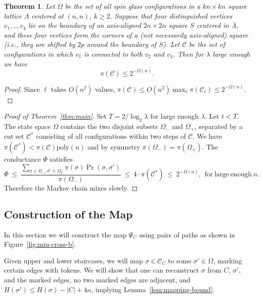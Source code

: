 \documentclass[letterpaper,english,numberwithinsect]{amsart}
\newtheorem{theorem}{Theorem}
\newcommand{\cC}{\mathcal{C}}
\begin{document}
\begin{theorem}\label{thm:all-p}
Let  $\Omega$ be the set of all spin glass configurations in a $kn\times kn$ square lattice $\Lambda$  centered at $(n, n)$, $k \geq 2$. Suppose that four distinguished vertices $v_1,..,v_4$ lie on the boundary of an axis-aligned $2n \times 2n$ square $S$ centered in $\overline{\Lambda}$, and these four vertices form the corners of a (not necessarily axis-aligned) square (i.e., they are shifted by $2p$ around the boundary of $S$).
Let $\cC$ be the set of configurations in which $v_1$ is connected to both $v_2$ and $v_4$. 
Then for $\lambda$ large enough we have
\begin{equation}\label{eqn:piOmega0}
\pi(\cC) \leq 2^{-\Omega(n)}.
\end{equation}
\end{theorem}
\begin{proof}
Since $\ell$ takes $O(n^2)$ values,
$\pi(\cC) \leq O(n^2) \max_{\ell} \pi(\cC_{\ell}) \leq 2^{-\Omega(n)}.$
\end{proof}

\begin{proof}[Proof of Theorem~\ref{thm:main}]
Set  $T = 2/\log_2\lambda$ for large enough $\lambda$. Let $t<T$. 
The state space $\Omega$ contains the two disjoint subsets $\Omega_-$ and $\Omega_+$, separated by a cut set $\cC^*$ consisting of all configurations within two steps of $\cC$. 
We have $\pi(\cC^*) < \pi(\cC) \mathrm{poly}(n)$ and by symmetry $\pi(\Omega_-) = \pi(\Omega_+)$. 
The conductance $\Phi$ satisfies 
\begin{equation}
\Phi \ \leq \ 
      \frac{\sum_{\sigma \in \Omega_-, \sigma' \in \Omega_{\cC}} \pi(\sigma) \Pr(\sigma, \sigma')} 
     {\pi(\Omega_-)}
    \  \leq \ 4\cdot \pi(\cC^*)
    \ \leq \ 2^{-\Omega(n)},~~ {\mathrm{for~large~enough}}~ n. 
\end{equation}
Therefore the Markov chain mixes slowly. 
\end{proof}

\subsection{Construction of the Map}\label{map_intro}

In this section we will construct the map $\Psi_C$
using pairs of paths as shown in Figure~\ref{fig:min-cross-b}. 

Given upper and lower staircases, we will map $\sigma \in \cC_C $ to some $\sigma' \in \Omega$,  marking certain edges with tokens. 
We will show that one can reconstruct $\sigma$ from $C$, $\sigma'$, and the marked edges, no two marked edges are adjacent, and  
$H(\sigma') \leq H(\sigma) - |C| + 4n$, implying Lemma~\ref{lem:mapping-bound}.
\end{document}
